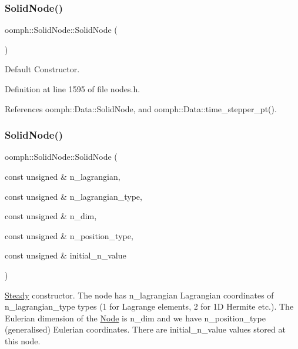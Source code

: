 \subsubsection{\texorpdfstring{Solid\+Node()}{SolidNode()}\hspace{0.1cm}{\footnotesize\ttfamily [1/4]}}
{\footnotesize\ttfamily oomph\+::\+Solid\+Node\+::\+Solid\+Node (\begin{DoxyParamCaption}{ }\end{DoxyParamCaption})\hspace{0.3cm}{\ttfamily [inline]}}



Default Constructor. 



Definition at line 1595 of file nodes.\+h.



References oomph\+::\+Data\+::\+Solid\+Node, and oomph\+::\+Data\+::time\+\_\+stepper\+\_\+pt().

\mbox{\label{classoomph_1_1SolidNode_ad8f4ed97c7124e7e55f1089bab99b9d7}} 
\subsubsection{\texorpdfstring{Solid\+Node()}{SolidNode()}\hspace{0.1cm}{\footnotesize\ttfamily [2/4]}}
{\footnotesize\ttfamily oomph\+::\+Solid\+Node\+::\+Solid\+Node (\begin{DoxyParamCaption}\item[{const unsigned \&}]{n\+\_\+lagrangian,  }\item[{const unsigned \&}]{n\+\_\+lagrangian\+\_\+type,  }\item[{const unsigned \&}]{n\+\_\+dim,  }\item[{const unsigned \&}]{n\+\_\+position\+\_\+type,  }\item[{const unsigned \&}]{initial\+\_\+n\+\_\+value }\end{DoxyParamCaption})}



\hyperlink{classoomph_1_1Steady}{Steady} constructor. The node has n\+\_\+lagrangian Lagrangian coordinates of n\+\_\+lagrangian\+\_\+type types (1 for Lagrange elements, 2 for 1D Hermite etc.). The Eulerian dimension of the \hyperlink{classoomph_1_1Node}{Node} is n\+\_\+dim and we have n\+\_\+position\+\_\+type (generalised) Eulerian coordinates. There are initial\+\_\+n\+\_\+value values stored at this node. 

